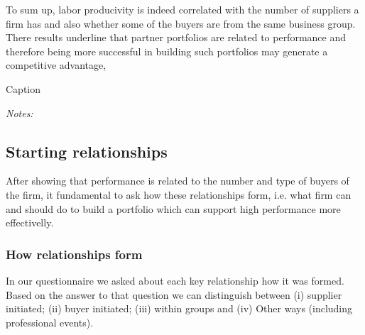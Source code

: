 \documentclass[final, dvipsnames, authoryear,12pt]{elsarticle}
\begin{document}
To sum up, labor producivity is indeed correlated with the number of suppliers a firm has and also whether some of the buyers are from the same business group. There results underline that partner portfolios are related to performance and therefore being more successful in building such portfolios may generate a competitive advantage,

\begin{table}[H]
    \caption{Caption}
    \label{tab:prod_regs}
    \centerline{}
    {\scriptsize \textit{Notes:}}
\end{table}
    



\subsection{Starting relationships}

After showing that performance is related to the number and type of buyers of the firm, it fundamental to ask how these relationships form, i.e. what firm can and should do to build a portfolio which can support high performance more effectivelly.

\subsubsection{How relationships form}

In our questionnaire we asked about each key relationship how it was formed. Based on the answer to that question we can distinguish between (i) supplier initiated; (ii) buyer initiated; (iii) within groups and (iv) Other ways (including professional events). 
\end{document}
